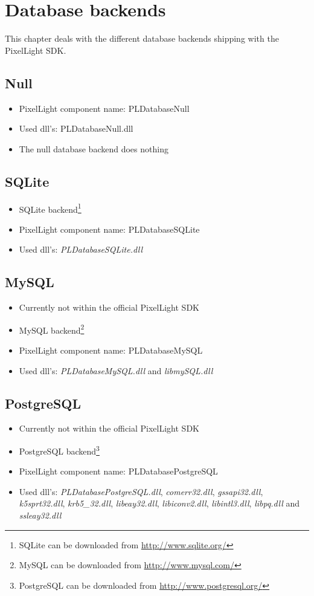 \chapter{Database backends}
This chapter deals with the different database backends shipping with the PixelLight SDK.




\section{Null}
\begin{itemize}
\item PixelLight component name: PLDatabaseNull
\item Used dll's: PLDatabaseNull.dll
\item The null database backend does nothing
\end{itemize}




\section{SQLite}
\begin{itemize}
\item SQLite backend\footnote{SQLite can be downloaded from \url{http://www.sqlite.org/}}
\item PixelLight component name: PLDatabaseSQLite
\item Used dll's: \emph{PLDatabaseSQLite.dll}
\end{itemize}




\section{MySQL}
\begin{itemize}
\item Currently not within the official PixelLight SDK
\item MySQL backend\footnote{MySQL can be downloaded from \url{http://www.mysql.com/}}
\item PixelLight component name: PLDatabaseMySQL
\item Used dll's: \emph{PLDatabaseMySQL.dll} and \emph{libmySQL.dll}
\end{itemize}




\section{PostgreSQL}
\begin{itemize}
\item Currently not within the official PixelLight SDK
\item PostgreSQL backend\footnote{PostgreSQL can be downloaded from \url{http://www.postgresql.org/}}
\item PixelLight component name: PLDatabasePostgreSQL
\item Used dll's: \emph{PLDatabasePostgreSQL.dll}, \emph{comerr32.dll}, \emph{gssapi32.dll}, \emph{k5sprt32.dll}, \emph{krb5\_32.dll}, \emph{libeay32.dll}, \emph{libiconv2.dll}, \emph{libintl3.dll}, \emph{libpq.dll} and \emph{ssleay32.dll}
\end{itemize}
